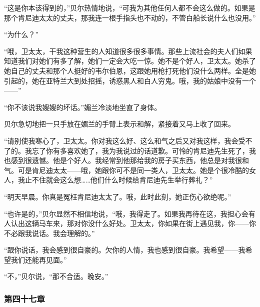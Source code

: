 \par “这是你本该得到的，”贝尔热情地说，“可我为其他任何人都不会这么做的。如果是那个肯尼迪太太的丈夫，那我连一根手指头也不动的，不管白船长说什么也没用。”
\par “为什么？”
\par “哦，卫太太，干我这种营生的人知道很多很多事情。那些上流社会的夫人们如果知道我们对她们有多了解，她们一定会大吃一惊。她不是个好人，卫太太。她杀了她自己的丈夫和那个人挺好的韦尔伯恩，这跟她用枪打死他们没什么两样。全是她引起的，她在亚特兰大到处招摇，诱惑黑人和白人穷鬼。哦，我的姑娘中没有一个——”
\par “你不该说我嫂嫂的坏话。”媚兰冷淡地坐直了身体。
\par 贝尔急切地把一只手放在媚兰的手臂上表示和解，紧接着又马上收了回来。
\par “请别使我寒心了，卫太太。你对我这么好、这么和气之后又对我这样，我会受不了的。我忘了你有多喜欢她了，我为我说过的话道歉。可怜的肯尼迪先生死了，我也感到很遗憾。他是个好人。我经常到他那给我的房子买东西，他总是对我很和气。可是肯尼迪太太——哦，她跟你可不是同一类人，卫太太。她是个很冷酷的女人，我止不住就会这么想……他们什么时候给肯尼迪先生举行葬礼？”
\par “明天早晨。你真是冤枉肯尼迪太太了。哦，此时此刻，她正伤心欲绝呢。”
\par “也许是的，”贝尔显然不相信地说，“哦，我得走了。如果我再待在这，我担心会有人认出这辆马车来，那对你没什么好处。卫太太，你如果在街上遇见我，你——你不必跟我说话。我会理解的。”
\par “跟你说话，我会感到很自豪的。欠你的人情，我也感到很自豪。我希望——我希望我们还能再见面。”
\par “不，”贝尔说，“那不合适。晚安。”

\subsubsection{第四十七章}


